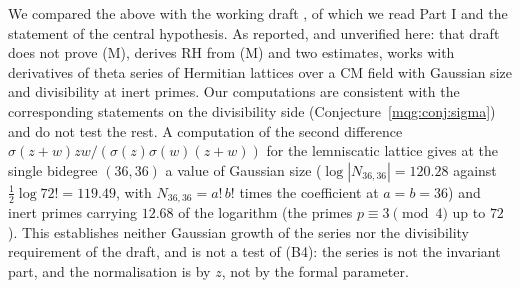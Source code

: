 We compared the above with the working draft \cite{Rub26}, of which we read Part I and the statement of the central hypothesis. As reported, and unverified here: that draft does not prove (M), derives RH from (M) and two estimates, works with derivatives of theta series of Hermitian lattices over a CM field with Gaussian size and divisibility at inert primes. Our computations are consistent with the corresponding statements on the divisibility side (Conjecture~\ref{mqg:conj:sigma}) and do not test the rest. A computation of the second difference $\sigma(z+w)zw/(\sigma(z)\sigma(w)(z+w))$ for the lemniscatic lattice gives at the single bidegree $(36,36)$ a value of Gaussian size ($\log|N_{36,36}|=120.28$ against $\frac12\log72!=119.49$, with $N_{36,36}=a!\,b!$ times the coefficient at $a=b=36$) and inert primes carrying $12.68$ of the logarithm (the primes $p\equiv3\pmod4$ up to $72$). This establishes neither Gaussian growth of the series nor the divisibility requirement of the draft, and is not a test of (B4): the series is not the invariant part, and the normalisation is by $z$, not by the formal parameter.

